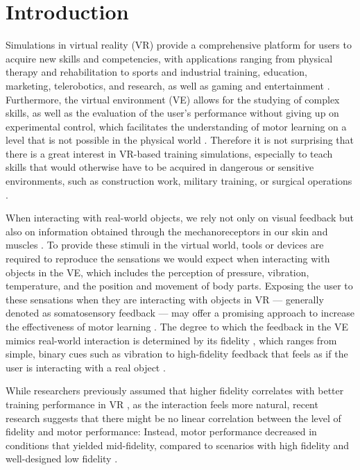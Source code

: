 
\section{Introduction}
Simulations in virtual reality (VR) provide a comprehensive platform for users to acquire new skills and competencies, with applications ranging from physical therapy and rehabilitation to sports and industrial training, education, marketing, telerobotics, and research, as well as gaming and entertainment \cite{Wu2023TrainingReality, Oagaz2022PerformanceReality}. Furthermore, the virtual environment (VE) allows for the studying of complex skills, as well as the evaluation of the user's performance without giving up on experimental control, which facilitates the understanding of motor learning on a level that is not possible in the physical world \cite{Harris2021ExploringSimulator, Levac2019LearningReview}. Therefore it is not surprising that there is a great interest in VR-based training simulations, especially to teach skills that would otherwise have to be acquired in dangerous or sensitive environments, such as construction work, military training, or surgical operations \cite{Adami2021EffectivenessTeleoperation, Lele2013VirtualUtility, Qi2021VirtualScenario}.

When interacting with real-world objects, we rely not only on visual feedback but also on information obtained through the mechanoreceptors in our skin and muscles \cite{Gonzalez-Grandon2021ProprioceptionInteraction}. To provide these stimuli in the virtual world, tools or devices are required to reproduce the sensations we would expect when interacting with objects in the VE, which includes the perception of pressure, vibration, temperature, and the position and movement of body parts. Exposing the user to these sensations when they are interacting with objects in VR --- generally denoted as somatosensory feedback --- may offer a promising approach to increase the effectiveness of motor learning \cite{Sainburg2022MovementNeurorehabilitation, Sigrist2013AugmentedReview}.
The degree to which the feedback in the VE mimics real-world interaction is determined by its fidelity \cite{Caird1996PersistentTraining}, which ranges from simple, binary cues such as vibration to high-fidelity feedback that feels as if the user is interacting with a real object \cite{Yang2023}.

While researchers previously assumed that higher fidelity correlates with better training performance in VR \cite{Caird1996PersistentTraining, Waller1998TheTraining}, as the interaction feels more natural, recent research suggests that there might be no linear correlation between the level of fidelity and motor performance: Instead, motor performance decreased in conditions that yielded mid-fidelity, compared to scenarios with high fidelity and well-designed low fidelity \cite{MahdiNabiyouni201520153DUI.}.

